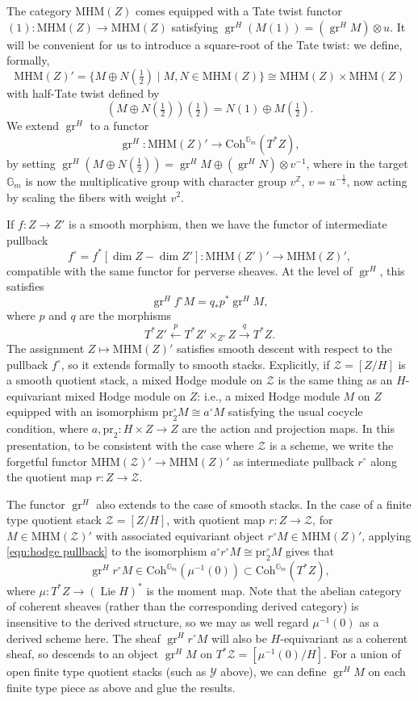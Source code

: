 \documentclass{amsart}
\newcommand{\gr}{\operatorname{gr}}
\newcommand{\mhm}{\mathrm{MHM}}
\newcommand{\mc}[1]{\mathcal{#1}}
\newcommand{\mb}[1]{\mathbb{#1}}
\theoremstyle{definition}
\numberwithin{equation}{section}
\begin{document}
The category $\mhm(Z)$ comes equipped with a Tate twist functor $(1) : \mhm(Z) \to \mhm(Z)$ satisfying $\gr^H(M(1)) = (\gr^H M) \otimes u$. It will be convenient for us to introduce a square-root of the Tate twist: we define, formally,
\[ \mhm(Z)' = \{M \oplus N(\tfrac{1}{2}) \mid M, N \in \mhm(Z)\} \cong \mhm(Z) \times \mhm(Z)\]
with half-Tate twist defined by
\[ (M \oplus N(\tfrac{1}{2}))\left(\tfrac{1}{2}\right) = N(1) \oplus M(\tfrac{1}{2}).\]
We extend $\gr^H$ to a functor
\[ \gr^H : \mhm(Z)' \to \mathrm{Coh}^{\mb{G}_m}(T^*Z),\]
by setting $\gr^H(M \oplus N(\tfrac{1}{2})) = \gr^H M \oplus (\gr^H N) \otimes v^{-1}$, where in the target $\mathbb{G}_m$ is now the multiplicative group with character group $v^{\mb{Z}}$, $v = u^{-\frac{1}{2}}$, now acting by scaling the fibers with weight $v^2$.

If $f : Z \to Z'$ is a smooth morphism, then we have the functor of intermediate pullback
\[ f^\circ = f^*[\dim Z - \dim Z'] : \mhm(Z')' \to \mhm(Z)',\]
compatible with the same functor for perverse sheaves. At the level of $\gr^H$, this satisfies
\begin{equation} \label{eqn:hodge pullback}
 \gr^H f^\circ M = q_*p^*\gr^H M,
\end{equation}
where $p$ and $q$ are the morphisms
\[ T^*Z' \xleftarrow{p} T^*Z' \times_{Z'} Z \xrightarrow{q} T^*Z.\]
The assignment $Z \mapsto \mhm(Z)'$ satisfies smooth descent with respect to the pullback $f^\circ$, so it extends formally to smooth stacks. Explicitly, if $\mc{Z} = [Z/H]$ is a smooth quotient stack, a mixed Hodge module on $\mc{Z}$ is the same thing as an $H$-equivariant mixed Hodge module on $Z$: i.e., a mixed Hodge module $M$ on $Z$ equipped with an isomorphism $\mathrm{pr}_2^\circ M \cong a^\circ M$ satisfying the usual cocycle condition, where $a, \mathrm{pr}_2 : H \times Z \to Z$ are the action and projection maps. In this presentation, to be consistent with the case where $\mc{Z}$ is a scheme, we write the forgetful functor $\mhm(\mc{Z})' \to \mhm(Z)'$ as intermediate pullback $r^\circ$ along the quotient map $r: Z \to \mc{Z}$.

The functor $\gr^H$ also extends to the case of smooth stacks. In the case of a finite type quotient stack $\mc{Z} = [Z/H]$, with quotient map $r : Z \to \mc{Z}$, for $M \in \mhm(\mc{Z})'$ with associated equivariant object $r^\circ M \in \mhm(Z)'$, applying \eqref{eqn:hodge pullback} to the isomorphism $a^\circ r^\circ M \cong \mathrm{pr}_2^\circ M$ gives that
\[ \gr^H r^\circ M \in \mathrm{Coh}^{\mb{G}_m}(\mu^{-1}(0)) \subset \mathrm{Coh}^{\mb{G}_m}(T^*Z),\]
where $\mu : T^*Z \to (\operatorname{Lie} H)^*$ is the moment map. Note that the abelian category of coherent sheaves (rather than the corresponding derived category) is insensitive to the derived structure, so we may as well regard $\mu^{-1}(0)$ as a derived scheme here. The sheaf $\gr^H r^\circ M$ will also be $H$-equivariant as a coherent sheaf, so descends to an object $\gr^H M$ on $T^*\mc{Z} = [\mu^{-1}(0)/H]$. For a union of open finite type quotient stacks (such as $\mc{Y}$ above), we can define $\gr^H M$ on each finite type piece as above and glue the results.
\end{document}
